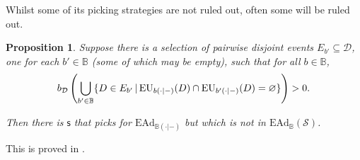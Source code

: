 \documentclass[a4paper,final]{article}
\newtheorem{proposition}[theorem]{Proposition}
\newcommand\EU{\mathrm{EU}}
\newcommand\EAd{\mathrm{EAd}}
\newcommand{\Decs}{\mathcal{D}}
\renewcommand\S{\mathcal{S}}
\newcommand\s{\mathsf{s}}
\newcommand{\IB}{\mathbb{B}}
\newcommand\SetDelimiter[1][]{
	\nonscript\,#1\vert \allowbreak \nonscript\,\mathopen{}}
\providecommand\given{\SetDelimiter}
\renewcommand{\emptyset}{\varnothing}
\newenvironment{CCM rewritten}
{\begingroup\color{blue}} %
{\endgroup}              %
\begin{document}
	Whilst some of its picking strategies are not ruled out, often some will be ruled out. 


		
\begin{proposition}\label{thm:ead-existsimpermissible[dep]}
Suppose there is a selection of pairwise disjoint events $E_{b'}\subseteq\Decs$, one for each $b'\in\IB$ (some of which may be empty), such that for all $b\in\IB$, $$b_\Decs\left(\bigcup_{b'\in\IB}\{D\in E_{b'}\given \EU_{b(\cdot|-)}(D)\cap \EU_{b'(\cdot|-)}(D)=\emptyset\}\right)>0.$$

Then there is $\s$ that picks for $\EAd_{\IB(\cdot|-)}$ but which is not in $\EAd_{\IB}(\S)$.


\end{proposition}
This is proved in .
\end{document}

